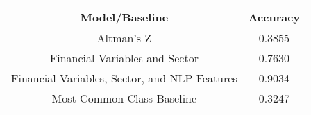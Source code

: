 \footnotesize
\begin{tabular}{cc}
\toprule
Model/Baseline & Accuracy \\
\midrule
Altman's Z & 0.3855 \\
Financial Variables and Sector & 0.7630 \\
Financial Variables, Sector, and NLP Features & 0.9034 \\
Most Common Class Baseline & 0.3247 \\
\bottomrule
\end{tabular}

\normalsize